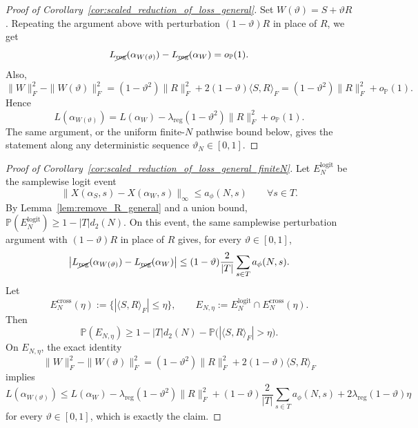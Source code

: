 \documentclass[11pt]{article}
\theoremstyle{plain}
\theoremstyle{definition}
\theoremstyle{remark}
\newcommand{\PP}{\mathbb{P}}
\newcommand{\1}{\mathbf{1}}
\begin{document}
\begin{proof}[Proof of Corollary~\ref{cor:scaled_reduction_of_loss_general}]
Set \(W(\vartheta)=S+\vartheta R\). Repeating the argument above with perturbation \((1-\vartheta)R\) in place of \(R\), we get
\[
L_{\cancel{\mathrm{reg}}}(\alpha_{W(\vartheta)})-L_{\cancel{\mathrm{reg}}}(\alpha_W)=o_{\PP}(1).
\]
Also,
\[
\|W\|_F^2-\|W(\vartheta)\|_F^2
=
(1-\vartheta^2)\|R\|_F^2+2(1-\vartheta)\langle S,R\rangle_F
=
(1-\vartheta^2)\|R\|_F^2+o_{\PP}(1).
\]
Hence
\[
L(\alpha_{W(\vartheta)})
=
L(\alpha_W)-\lambda_{\mathrm{reg}}(1-\vartheta^2)\|R\|_F^2+o_{\PP}(1).
\]
The same argument, or the uniform finite-\(N\) pathwise bound below, gives the statement along any deterministic sequence \(\vartheta_N\in[0,1]\).
\end{proof}

\begin{proof}[Proof of Corollary~\ref{cor:scaled_reduction_of_loss_general_finiteN}]
Let \(E_N^{\mathrm{logit}}\) be the samplewise logit event
\[
\|X(\alpha_S,s)-X(\alpha_W,s)\|_\infty\le a_\phi(N,s)
\qquad\forall s\in T.
\]
By Lemma~\ref{lem:remove_R_general} and a union bound, \(\PP(E_N^{\mathrm{logit}})\ge1-|T|d_2(N)\). On this event, the same samplewise perturbation argument with \((1-\vartheta)R\) in place of \(R\) gives, for every \(\vartheta\in[0,1]\),
\[
\big|L_{\cancel{\mathrm{reg}}}(\alpha_{W(\vartheta)})-L_{\cancel{\mathrm{reg}}}(\alpha_W)\big|
\le
(1-\vartheta)\frac{2}{|T|}\sum_{s\in T}a_\phi(N,s).
\]
Let
\[
E_N^{\mathrm{cross}}(\eta):=\big\{|\langle S,R\rangle_F|\le \eta\big\},
\qquad
E_{N,\eta}:=E_N^{\mathrm{logit}}\cap E_N^{\mathrm{cross}}(\eta).
\]
Then
\[
\PP(E_{N,\eta})\ge 1-|T|d_2(N)-\PP\!\big(|\langle S,R\rangle_F|>\eta\big).
\]
On \(E_{N,\eta}\), the exact identity
\[
\|W\|_F^2-\|W(\vartheta)\|_F^2
=
(1-\vartheta^2)\|R\|_F^2+2(1-\vartheta)\langle S,R\rangle_F
\]
implies
\[
L(\alpha_{W(\vartheta)})
\le
L(\alpha_W)
-\lambda_{\mathrm{reg}}(1-\vartheta^2)\|R\|_F^2
+(1-\vartheta)\frac{2}{|T|}\sum_{s\in T}a_\phi(N,s)
+2\lambda_{\mathrm{reg}}(1-\vartheta)\eta
\]
for every \(\vartheta\in[0,1]\), which is exactly the claim.
\end{proof}
\end{document}

